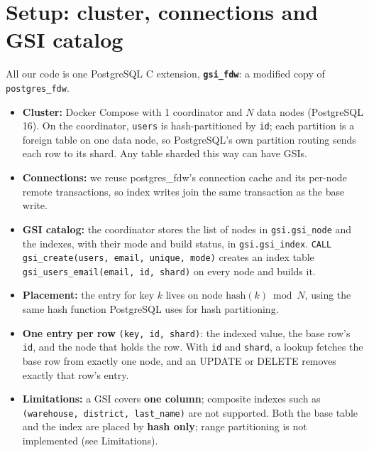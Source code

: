 \documentclass[11pt,a4paper]{article}
\begin{document}
\section{Setup: cluster, connections and GSI catalog}
All our code is one PostgreSQL C extension, \textbf{\texttt{gsi\_fdw}}: a modified copy of \texttt{postgres\_fdw}.
\begin{itemize}
  \item \textbf{Cluster:} Docker Compose with 1 coordinator and $N$ data nodes (PostgreSQL 16). On the
        coordinator, \texttt{users} is hash-partitioned by \texttt{id}; each partition is a foreign table
        on one data node, so PostgreSQL's own partition routing sends each row to its shard. Any table
        sharded this way can have GSIs.
  \item \textbf{Connections:} we reuse postgres\_fdw's connection cache and its per-node remote
        transactions, so index writes join the same transaction as the base write.
  \item \textbf{GSI catalog:} the coordinator stores the list of nodes in \texttt{gsi.gsi\_node} and the
        indexes, with their mode and build status, in \texttt{gsi.gsi\_index}.
        \texttt{CALL gsi\_create(\textquotesingle{}users\textquotesingle{},
        \textquotesingle{}email\textquotesingle{}, unique, mode)} creates an index table
        \texttt{gsi\_users\_email(email, id, shard)} on every node and builds it.
  \item \textbf{Placement:} the entry for key $k$ lives on node $\mathrm{hash}(k) \bmod N$, using the same
        hash function PostgreSQL uses for hash partitioning.
  \item \textbf{One entry per row} \texttt{(key, id, shard)}: the indexed value, the base row's
        \texttt{id}, and the node that holds the row. With \texttt{id} and \texttt{shard}, a lookup fetches
        the base row from exactly one node, and an UPDATE or DELETE removes exactly that row's entry.
  \item \textbf{Limitations:} a GSI covers \textbf{one column}; composite indexes such as
        \texttt{(warehouse, district, last\_name)} are not supported. Both the base table and the index
        are placed by \textbf{hash only}; range partitioning is not implemented (see Limitations).
\end{itemize}
\end{document}
